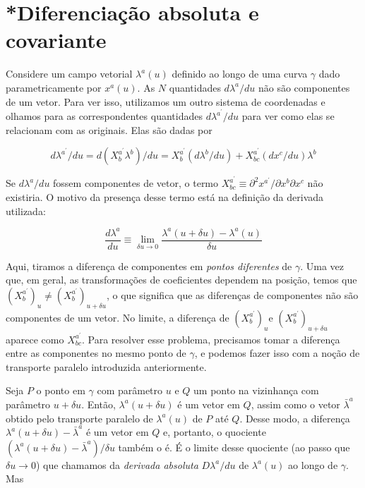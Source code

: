 \section{*Diferenciação absoluta e covariante}\label{sec:DiferenciacaoAbsolutaCovariante}

Considere um campo vetorial $ \lambda^a(u) $ definido ao longo de uma curva $ \gamma $ dado parametricamente por $ x^a(u) $. As $ N $ quantidades $ d \lambda^{a} / d u $ não são componentes de um vetor. Para ver isso, utilizamos um outro sistema de coordenadas e olhamos para as correspondentes quantidades $ d \lambda^{a^{\prime}} / d u $ para ver como elas se relacionam com as originais. Elas são dadas por

\begin{equation}\label{eq:TransformacaoCoordenadasDerivadaCurva}
d \lambda^{a^{\prime}} / d u=d\left(X_{b}^{a^{\prime}} \lambda^{b}\right) / d u=X_{b}^{a^{\prime}}\left(d \lambda^{b} / d u\right)+X_{b c}^{a^{\prime}}\left(d x^{c} / d u\right) \lambda^{b}
\end{equation}

Se $ d \lambda^{a} / d u $ fossem componentes de vetor, o termo $ X_{b c}^{a^{\prime}} \equiv \partial^{2} x^{a^{\prime}} / \partial x^{b} \partial x^{c} $ não existiria. O motivo da presença desse termo está na definição da derivada utilizada:

\begin{equation}\label{eq:DerivadaTotalLambda}
\frac{d \lambda^{a}}{d u} \equiv \lim _{\delta u \rightarrow 0} \frac{\lambda^{a}(u+\delta u)-\lambda^{a}(u)}{\delta u}
\end{equation}

Aqui, tiramos a diferença de componentes em \textit{pontos diferentes} de $ \gamma $. Uma vez que, em geral, as transformações de coeficientes dependem na posição, temos que $ \left(X_{b}^{a^{\prime}}\right)_{u} \neq\left(X_{b}^{a^{\prime}}\right)_{u+\delta u} $, o que significa que as diferenças de componentes não são componentes de um vetor. No limite, a diferença de $ \left(X_{b}^{a^{\prime}}\right)_{u} \text{e } \left(X_{b}^{a^{\prime}}\right)_{u+\delta u} $ aparece como $ X_{b c}^{a^{\prime}} $. Para resolver esse problema, precisamos tomar a diferença entre as componentes no mesmo ponto de $ \gamma $, e podemos fazer isso com a noção de transporte paralelo introduzida anteriormente.

Seja $ P $ o ponto em $ \gamma $ com parâmetro $ u $ e $ Q $ um ponto na vizinhança com parâmetro $ u+\delta u $. Então, $ \lambda^{a}(u+\delta u) $ é um vetor em $ Q $, assim como o vetor $ \bar{\lambda}^{a} $ obtido pelo transporte paralelo de $ \lambda^{a}(u) $ de $ P $ até $ Q$. Desse modo, a diferença $ \lambda^{a}(u+\delta u)-\bar{\lambda}^{a} $ é um vetor em $ Q $ e, portanto, o quociente $ \left(\lambda^{a}(u+\delta u)-\bar{\lambda}^{a}\right) / \delta u $ também o é. É o limite desse quociente (ao passo que $ \delta u \rightarrow 0 $) que chamamos da \textit{derivada absoluta} $ D \lambda^{a} / d u $ de $ \lambda^{a}(u) $ ao longo de $ \gamma $. Mas

